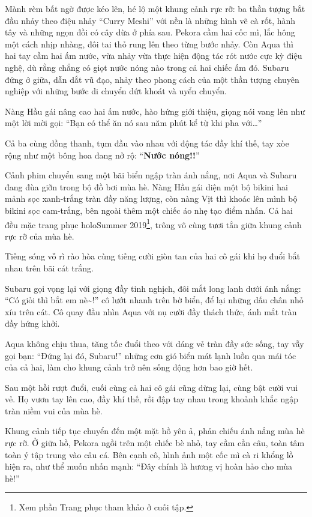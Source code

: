 \documentclass[../main.tex]{subfiles}
\begin{document}
Mành rèm bất ngờ được kéo lên, hé lộ một khung cảnh rực rỡ: ba thần tượng bắt đầu nhảy theo điệu nhảy ``Curry Meshi'' với nền là những hình vẽ cà rốt, hành tây và những ngọn đồi có cây dừa ở phía sau. Pekora cầm hai cốc mì, lắc hông một cách nhịp nhàng, đôi tai thỏ rung lên theo từng bước nhảy. Còn Aqua thì hai tay cầm hai ấm nước, vừa nhảy vừa thực hiện động tác rót nước cực kỳ điệu nghệ, dù rằng chẳng có giọt nước nóng nào trong cả hai chiếc ấm đó. Subaru đứng ở giữa, dẫn dắt vũ đạo, nhảy theo phong cách của một thần tượng chuyên nghiệp với những bước di chuyển dứt khoát và uyển chuyển.

Nàng Hầu gái nâng cao hai ấm nước, hào hứng giới thiệu, giọng nói vang lên như một lời mời gọi: ``Bạn có thể ăn nó sau năm phút kể từ khi pha với\dots''

Cả ba cùng đồng thanh, tụm đầu vào nhau với động tác đầy khí thế, tay xòe rộng như một bông hoa đang nở rộ: ``\textbf{Nước nóng!!}''


Cảnh phim chuyển sang một bãi biển ngập tràn ánh nắng, nơi Aqua và Subaru đang đùa giỡn trong bộ đồ bơi mùa hè. Nàng Hầu gái diện một bộ bikini hai mảnh sọc xanh-trắng tràn đầy năng lượng, còn nàng Vịt thì khoác lên mình bộ bikini sọc cam-trắng, bên ngoài thêm một chiếc áo nhẹ tạo điểm nhấn. Cả hai đều mặc trang phục holoSummer 2019\footnote{Xem phần {\abv Trang phục tham khảo} ở cuối tập.}, trông vô cùng tươi tắn giữa khung cảnh rực rỡ của mùa hè.

Tiếng sóng vỗ rì rào hòa cùng tiếng cười giòn tan của hai cô gái khi họ đuổi bắt nhau trên bãi cát trắng.

Subaru gọi vọng lại với giọng đầy tinh nghịch, đôi mắt long lanh dưới ánh nắng: ``Có giỏi thì bắt em nè\~{}!'' cô lướt nhanh trên bờ biển, để lại những dấu chân nhỏ xíu trên cát. Cô quay đầu nhìn Aqua với nụ cười đầy thách thức, ánh mắt tràn đầy hứng khởi.

Aqua không chịu thua, tăng tốc đuổi theo với dáng vẻ tràn đầy sức sống, tay vẫy gọi bạn: ``Đứng lại đó, Subaru!'' những cơn gió biển mát lạnh luồn qua mái tóc của cả hai, làm cho khung cảnh trở nên sống động hơn bao giờ hết.

Sau một hồi rượt đuổi, cuối cùng cả hai cô gái cũng dừng lại, cùng bật cười vui vẻ. Họ vươn tay lên cao, đầy khí thế, rồi đập tay nhau trong khoảnh khắc ngập tràn niềm vui của mùa hè.


Khung cảnh tiếp tục chuyển đến một mặt hồ yên ả, phản chiếu ánh nắng mùa hè rực rỡ. Ở giữa hồ, Pekora ngồi trên một chiếc bè nhỏ, tay cầm cần câu, toàn tâm toàn ý tập trung vào câu cá. Bên cạnh cô, hình ảnh một cốc mì cà ri khổng lồ hiện ra, như thể muốn nhấn mạnh: ``Đây chính là hương vị hoàn hảo cho mùa hè!''
\end{document}
